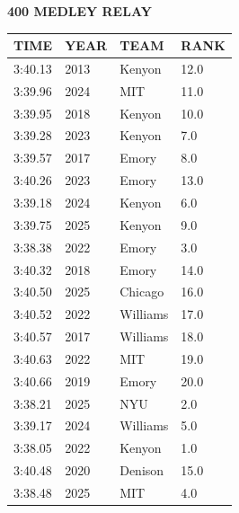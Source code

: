 \begin{table}[H]
\centering
\begin{minipage}[t]{0.6\textwidth}
\centering
\textbf{400 MEDLEY RELAY}\\[0.1cm]
\begin{tabular}{@{}p{1.8cm}p{1.2cm}p{1.4cm}p{0.8cm}@{}}
\hline
    \textbf{TIME} & \textbf{YEAR} & \textbf{TEAM} & \textbf{RANK} \\
\hline
    3:40.13 & 2013 & Kenyon & 12.0 \\
    3:39.96 & 2024 & MIT & 11.0 \\
    3:39.95 & 2018 & Kenyon & 10.0 \\
    3:39.28 & 2023 & Kenyon & 7.0 \\
    3:39.57 & 2017 & Emory & 8.0 \\
    3:40.26 & 2023 & Emory & 13.0 \\
    3:39.18 & 2024 & Kenyon & 6.0 \\
    3:39.75 & 2025 & Kenyon & 9.0 \\
    3:38.38 & 2022 & Emory & 3.0 \\
    3:40.32 & 2018 & Emory & 14.0 \\
    3:40.50 & 2025 & Chicago & 16.0 \\
    3:40.52 & 2022 & Williams & 17.0 \\
    3:40.57 & 2017 & Williams & 18.0 \\
    3:40.63 & 2022 & MIT & 19.0 \\
    3:40.66 & 2019 & Emory & 20.0 \\
    3:38.21 & 2025 & NYU & 2.0 \\
    3:39.17 & 2024 & Williams & 5.0 \\
    3:38.05 & 2022 & Kenyon & 1.0 \\
    3:40.48 & 2020 & Denison & 15.0 \\
    3:38.48 & 2025 & MIT & 4.0 \\
\hline
\end{tabular}
\end{minipage}
\end{table}

